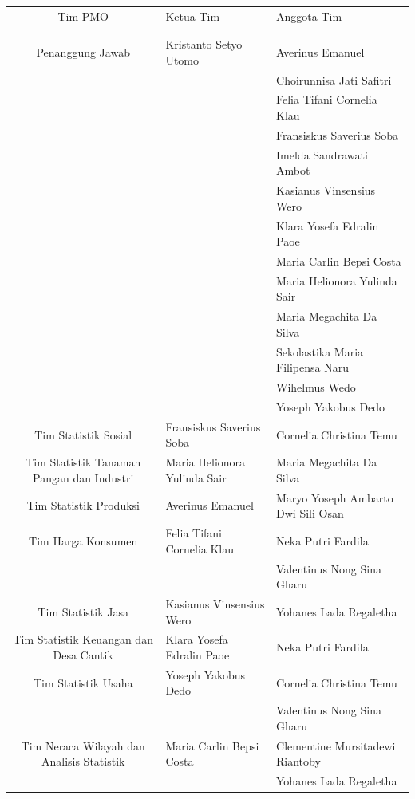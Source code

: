 \documentclass{article}
\begin{document}
\begin{longtable}{CTL}

\toprule
	\centering Tim PMO &
	\centering Ketua Tim &
	\centering Anggota Tim
	\tabularnewline{}
	 &  & 
	\tabularnewline{}
	{} & {} & {} \\
\midrule
	Penanggung Jawab & Kristanto Setyo Utomo & Averinus Emanuel \\
	  & & Choirunnisa Jati Safitri \\
	  & & Felia Tifani Cornelia Klau\\
	  & & Fransiskus Saverius Soba\\
	  & & Imelda Sandrawati Ambot\\
	  & & Kasianus Vinsensius Wero\\
	  & & Klara Yosefa Edralin Paoe\\
	  & & Maria Carlin Bepsi Costa\\
	  & & Maria Helionora Yulinda Sair\\
	  & & Maria Megachita Da Silva\\
	  & & Sekolastika Maria Filipensa Naru \\
	  & & Wihelmus Wedo\\
	  & & Yoseph Yakobus Dedo\\
\midrule
	Tim Statistik Sosial & Fransiskus Saverius Soba & Cornelia Christina Temu\\
\midrule
	Tim Statistik Tanaman Pangan dan Industri & Maria Helionora Yulinda Sair & Maria Megachita Da Silva\\
\midrule
	Tim Statistik Produksi & Averinus Emanuel & Maryo Yoseph Ambarto Dwi Sili Osan\\
\midrule
	Tim Harga Konsumen & Felia Tifani Cornelia Klau & Neka Putri Fardila\\
	{} & {} & Valentinus Nong Sina Gharu \\
\midrule
	Tim Statistik Jasa & Kasianus Vinsensius Wero & Yohanes Lada Regaletha  \\
\midrule
	Tim Statistik Keuangan dan Desa Cantik & Klara Yosefa Edralin Paoe & Neka Putri Fardila\\
\midrule
	Tim Statistik Usaha & Yoseph Yakobus Dedo & Cornelia Christina Temu\\
	{} & {} & Valentinus Nong Sina Gharu  \\
\midrule
	Tim Neraca Wilayah dan Analisis Statistik & Maria Carlin Bepsi Costa & Clementine Mursitadewi Riantoby\\
	  & & Yohanes Lada Regaletha \\

\end{longtable}
\end{document}
